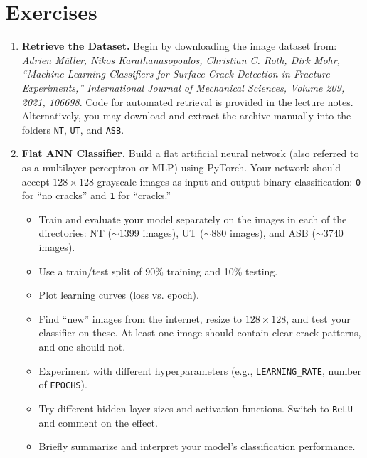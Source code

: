 \documentclass[12pt]{article}
\begin{document}
\section*{Exercises}
\begin{enumerate}

\item \textbf{Retrieve the Dataset.}  
Begin by downloading the image dataset from:  
\textit{Adrien Müller, Nikos Karathanasopoulos, Christian C. Roth, Dirk Mohr, “Machine Learning Classifiers for Surface Crack Detection in Fracture Experiments,” International Journal of Mechanical Sciences, Volume 209, 2021, 106698}.  
Code for automated retrieval is provided in the lecture notes. Alternatively, you may download and extract the archive manually into the folders \texttt{NT}, \texttt{UT}, and \texttt{ASB}.

\item \textbf{Flat ANN Classifier.}  
Build a flat artificial neural network (also referred to as a multilayer perceptron or MLP) using PyTorch. Your network should accept $128 \times 128$ grayscale images as input and output binary classification: \texttt{0} for “no cracks” and \texttt{1} for “cracks.”  
\begin{itemize}
    \item Train and evaluate your model separately on the images in each of the directories: NT ($\sim$1399 images), UT ($\sim$880 images), and ASB ($\sim$3740 images).
    \item Use a train/test split of 90\% training and 10\% testing.
    \item Plot learning curves (loss vs. epoch).
    \item Find “new” images from the internet, resize to $128 \times 128$, and test your classifier on these. At least one image should contain clear crack patterns, and one should not.
    \item Experiment with different hyperparameters (e.g., \texttt{LEARNING\_RATE}, number of \texttt{EPOCHS}).
    \item Try different hidden layer sizes and activation functions. Switch to \texttt{ReLU} and comment on the effect.
    \item Briefly summarize and interpret your model's classification performance.
\end{itemize}


\end{enumerate}
\end{document}
